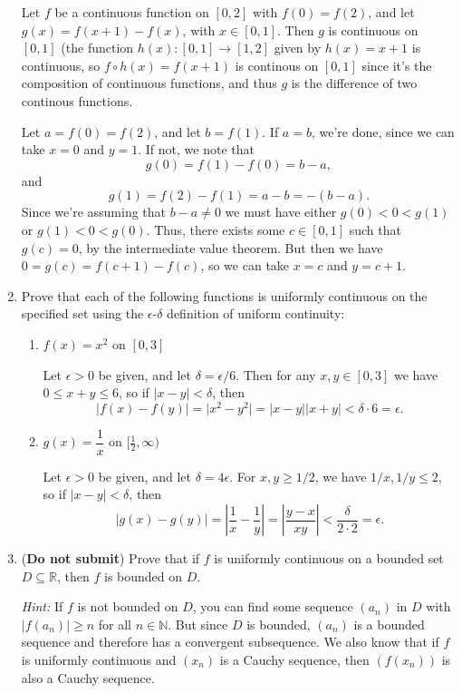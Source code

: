 \documentclass[letterpaper,12pt]{article}
\newcommand{\R}{\mathbb{R}}
\newcommand{\N}{\mathbb{N}}
\newcommand{\abs}[1]{\lvert #1\rvert}
\newcommand{\Abs}[1]{\left| #1\right|}
\begin{document}
\begin{enumerate}
Let $f$ be a continuous function on $[0,2]$ with $f(0)=f(2)$, and let $g(x)=f(x+1)-f(x)$, with $x\in [0,1]$. Then $g$ is continuous on $[0,1]$ (the function $h(x):[0,1]\to [1,2]$ given by $h(x)=x+1$ is continuous, so $f\circ h(x) = f(x+1)$ is continous on $[0,1]$ since it's the composition of continuous functions, and thus $g$ is the difference of two continous functions.

Let $a=f(0)=f(2)$, and let $b=f(1)$. If $a=b$, we're done, since we can take $x=0$ and $y=1$. If not, we note that
\[
 g(0) = f(1)-f(0) = b-a,
\]
and
\[
 g(1) = f(2)-f(1) = a-b = -(b-a).
\]
Since we're assuming that $b-a\neq 0$ we must have either $g(0)<0<g(1)$ or $g(1)<0<g(0)$. Thus, there exists some $c\in [0,1]$ such that $g(c)=0$, by the intermediate value theorem. But then we have $0=g(c) = f(c+1)-f(c)$, so we can take $x=c$ and $y=c+1$.

\bigskip

\item Prove that each of the following functions is uniformly continuous on the specified set using the $\epsilon$-$\delta$ definition of uniform continuity:
\begin{enumerate}
 \item $f(x)=x^2$ on $[0,3]$

\bigskip

Let $\epsilon>0$ be given, and let $\delta=\epsilon/6$. Then for any $x,y\in [0,3]$ we have $0\leq x+y\leq 6$, so if $\abs{x-y}<\delta$, then
\[
 \abs{f(x)-f(y)} = \abs{x^2-y^2} = \abs{x-y}\abs{x+y}<\delta\cdot 6=\epsilon.
\]


\bigskip

 \item $g(x)=\dfrac{1}{x}$ on $[\frac{1}{2},\infty)$

\bigskip

Let $\epsilon>0$ be given, and let $\delta = 4\epsilon$. For $x,y\geq 1/2$, we have $1/x,1/y\leq 2$, so if $\abs{x-y}<\delta$, then
\[
 \abs{g(x)-g(y)} = \Abs{\frac{1}{x}-\frac{1}{y}} = \Abs{\frac{y-x}{xy}}<\frac{\delta}{2\cdot 2}=\epsilon.
\]


\bigskip

\end{enumerate}
\item ({\bf Do not submit}) Prove that if $f$ is uniformly continuous on a bounded set $D\subseteq \R$, then $f$ is bounded on $D$.

{\em Hint:} If $f$ is not bounded on $D$, you can find some sequence $(a_n)$ in $D$ with $\abs{f(a_n)}\geq n$ for all $n\in\N$. But since $D$ is bounded, $(a_n)$ is a bounded sequence and therefore has a convergent subsequence. We also know that if $f$ is uniformly continuous and $(x_n)$ is a Cauchy sequence, then $(f(x_n))$ is also a Cauchy sequence.


\end{enumerate}
\end{document}
